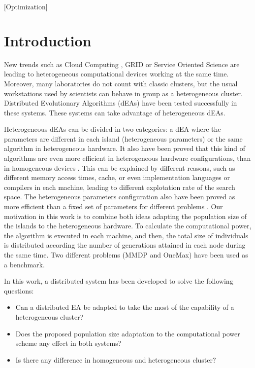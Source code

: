 \documentclass{sig-alternate}
\begin{document}
[Optimization]






%
%
\section{Introduction}
\label{sec:intro}
%
New trends such as Cloud Computing \cite{CLOUD}, GRID \cite{OPENSCIENCEGRID} or Service Oriented Science \cite{GLOBUS} are leading to heterogeneous computational devices working at the same time.  Moreover, many laboratories do not count with classic clusters, but the usual workstations used by scientists can behave in group as a heterogeneous cluster. Distributed Evolutionary Algorithms (dEAs) have been tested successfully in these systems. These systems can take advantage of heterogeneous dEAs. 

Heterogeneous dEAs can be divided in two categories: a dEA where the parameters are different in each island (heterogeneous parameters) or the same algorithm in heterogeneous hardware. It also have been proved that this kind of algorithms are even more efficient in heterogeneous hardware configurations, than in homogeneous devices \cite{HETEROGENEOUSHARD}. This can be explained by different reasons, such as different memory access times, cache, or even implementation languages or compilers in each machine, leading to different explotation rate of the search space. The heterogeneous parameters configuration also have been proved as more efficient than a fixed set of parameters for different problems \cite{HETEROGENEOUSPARAMETERS}. Our motivation in this work is to combine both ideas adapting the population size of the islands to the heterogeneous hardware. To calculate the computational power, the algorithm is executed in each machine, and then, the total size of individuals is distributed according the number of generations attained in each node during the same time. Two different problems (MMDP and OneMax) have been used as a benchmark.


In this work, a distributed system has been developed to solve the following questions:
\begin{itemize}
 \item Can a distributed EA be adapted to take the most of the capability of a heterogeneous cluster?
 \item Does the proposed population size adaptation to the computational power scheme any effect in both systems?
 \item Is there any difference in homogeneous and heterogeneous cluster?
\end{itemize}
\end{document}
